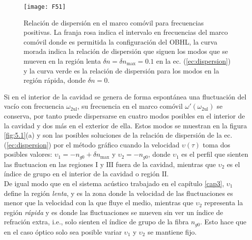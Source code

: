 \begin{figure}\centering
	\texttt{[image: F51]}
	\caption{Relaci\'{o}n de dispersi\'{o}n en el marco com\'{o}vil para frecuencias positivas. La franja rosa indica el intervalo en frecuencias del marco com\'{o}vil donde es permitida la configuraci\'{o}n del OBHL, la curva morada indica la relaci\'{o}n de dispersi\'{o}n que siguen los modos que se mueven en la regi\'{o}n lenta $\delta n=\delta n_{\text{max}}=0.1$ en la ec. (\ref{ec:dispersion}) y la curva verde es la relaci\'{o}n de dispersi\'{o}n para los modos en la regi\'{o}n r\'{a}pida, donde $\delta n=0.$}\label{fig:5.0}
\end{figure}

Si en el interior de la cavidad se genera de forma espont\'{a}nea una fluctuaci\'{o}n del vac\'{i}o con frecuencia $\omega_{\text{2ul}}$, su frecuencia en el marco com\'{o}vil $\omega'(\omega_{\text{2ul}})$ se conserva, por tanto puede dispersarse en cuatro modos posibles  en el interior de la cavidad y dos m\'{a}s en el exterior de ella. Estos modos se muestran en la figura \ref{fig:5.1}(a) y son las posibles soluciones de la relaci\'{o}n de dispersi\'{o}n de la ec. (\ref{ec:dispersion}) por el m\'{e}todo gr\'{a}fico cuando la velocidad $\upsilon(\tau)$ toma dos posibles valores: $\upsilon_1=-n_{g0}+\delta n_{\text{max}}$ y $\upsilon_2=-n_{g0}$, donde $\upsilon_1$ es el perfil que sienten las fluctuacion en las regiones $\text{I}$ y $\text{III}$ fuera de la cavidad, mientras que  $\upsilon_2$    es el  \'{i}ndice de grupo en el interior de la cavidad o regi\'{o}n $\text{II}$.\\

De igual modo que en el sistema ac\'{u}stico trabajado en el cap\'{i}tulo \ref{cap3}, $\upsilon_1$ define la regi\'{o}n \textit{lenta}, y es la zona donde la velocidad de las fluctuaciones es menor que la velocidad con la que fluye el medio, mientras que $\upsilon_2$ representa la regi\'{o}n \textit{r\'{a}pida} y es donde las fluctuaciones se mueven sin ver un \'{i}ndice de refraci\'{o}n extra, i.e., solo sienten el \'{i}ndice de grupo de la fibra $n_{g0}$. Esto hace que en el caso \'{o}ptico solo sea posible variar $\upsilon_1$ y $\upsilon_2$ se mantiene fijo.\\

